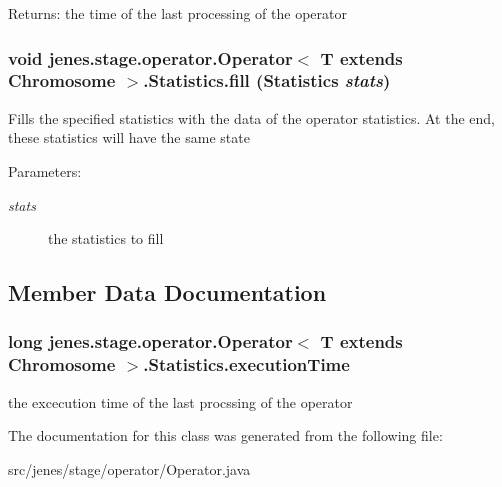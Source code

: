 \begin{Desc}
\item[Returns:]the time of the last processing of the operator \end{Desc}
\hypertarget{classjenes_1_1stage_1_1operator_1_1_operator_3_01_t_01extends_01_chromosome_01_4_1_1_statistics_26f2fb7bb11b9d05d95705ec95f470cf}{
\subsubsection[fill]{\setlength{\rightskip}{0pt plus 5cm}void jenes.stage.operator.Operator$<$ T extends Chromosome $>$.Statistics.fill (Statistics {\em stats})}}
\label{classjenes_1_1stage_1_1operator_1_1_operator_3_01_t_01extends_01_chromosome_01_4_1_1_statistics_26f2fb7bb11b9d05d95705ec95f470cf}


Fills the specified statistics with the data of the operator statistics. At the end, these statistics will have the same state

\begin{Desc}
\item[Parameters:]
\begin{description}
\item[{\em stats}]the statistics to fill \end{description}
\end{Desc}


\subsection{Member Data Documentation}
\hypertarget{classjenes_1_1stage_1_1operator_1_1_operator_3_01_t_01extends_01_chromosome_01_4_1_1_statistics_3e7fc955df9ca708795c24336b12f937}{
\subsubsection[executionTime]{\setlength{\rightskip}{0pt plus 5cm}long jenes.stage.operator.Operator$<$ T extends Chromosome $>$.Statistics.executionTime}}
\label{classjenes_1_1stage_1_1operator_1_1_operator_3_01_t_01extends_01_chromosome_01_4_1_1_statistics_3e7fc955df9ca708795c24336b12f937}


the excecution time of the last procssing of the operator 

The documentation for this class was generated from the following file:\begin{CompactItemize}
\item 
src/jenes/stage/operator/Operator.java\end{CompactItemize}
